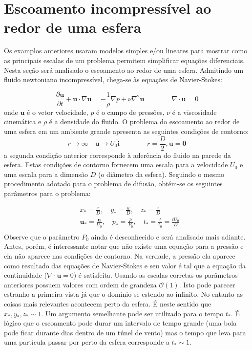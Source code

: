 \documentclass[article,12pt,oneside,a4paper,english,brazil,sumario=tradicional]{abntex2}
\newcommand{\p}[1]{\ensuremath{ \mathbf{#1}}}    %
\newcommand{\lra}{\ensuremath{\longrightarrow}}
\newcommand{\pd}{\ensuremath{\partial}}
\begin{document}
\section{Escoamento incompressível ao redor de uma esfera}


Os examplos anteriores usaram modelos simples e/ou lineares para mostrar como as principais escalas de um problema permitem simplificar equações diferenciais. Nesta seção será analisado o escoamento ao redor de uma esfera. Admitindo um fluido newtoniano incompressível, chega-se às equações de Navier-Stokes:

\begin{equation}
\frac{\pd\p{u}}{\pd t} + \p{u}\cdot\nabla\p{u} = -\frac{1}{\rho}\nabla p + \nu\nabla^2\p{u} \qquad\qquad \nabla\cdot\p{u} = 0
\label{eq:ns}
\end{equation}
onde $\p{u}$ é o vetor velocidade, $p$ é o campo de pressões, $\nu$ é a viscosidade cinemática e $\rho$ é a densidade do fluido. O problema do escoamento ao redor de uma esfera em um ambiente grande apresenta as seguintes condições de contorno:
\[
 r\lra\infty \quad \p{u}\lra U_0\p{\hat{i}} \qquad\qquad r=\frac{D}{2}, \p{u} = \p{0}
\]
a segunda condição anterior corresponde à aderência do fluido na parede da esfera. Estas condições de contorno fornecem uma escala para a velocidade $U_0$ e uma escala para a dimensão $D$ (o diâmetro da esfera). Seguindo o mesmo procedimento adotado para o problema de difusão, obtém-se os seguintes parâmetros para o problema:

\[
\begin{aligned}
&x_* = \frac{x}{D}, \quad y_* = \frac{y}{D}, \quad z_* = \frac{z}{D}\\
&\p{u}_* = \frac{\p{u}}{U_0}, \quad p_* = \frac{p}{P_0}, \quad t_* = \frac{t}{t_0} = \frac{tU_0}{D} \\
\end{aligned}
\]
Observe que o parâmetro $P_0$ ainda é desconhecido e será analisado mais adiante. Antes, porém, é interessante notar que não existe uma equação para a pressão e ela não aparece nas condições de contorno. Na verdade, a pressão ela aparece como resultado das equações de Navier-Stokes e seu valor é tal que a equação da continuidade ($\nabla\cdot\p{u}=0$) é satisfeita. Usando as escalas corretas os parâmetros anteriores possuem valores com ordem de grandeza $\mathcal{O}(1)$. Isto pode parecer estranho a primeira vista já que o domínio se estendo ao infinito. No entanto as coisas mais relevantes acontecem perto da esfera. É neste sentido que $x_*, y_*, z_* \sim 1$. Um argumento semelhante pode ser utilizado para o tempo $t_*$. É lógico que o escoamento pode durar um intervalo de tempo grande (uma bola pode ficar durante dias dentro de um túnel de vento) mas o tempo que leva para uma partícula passar por perto da esfera corresponde a  $t_*\sim 1$. 
\end{document}
